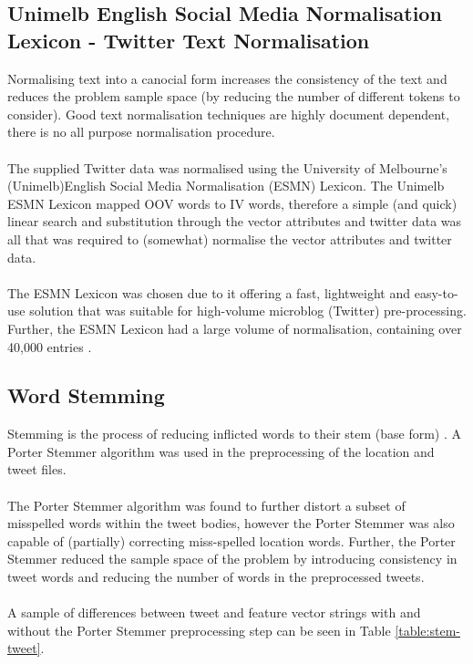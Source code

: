 \documentclass[11pt]{article}
\begin{document}
\subsection{Unimelb English Social Media Normalisation Lexicon - Twitter Text Normalisation}
Normalising text into a canocial form increases the consistency of the text and reduces the problem sample space (by reducing the number of different tokens to consider). Good text normalisation techniques are highly document dependent, there is no all purpose normalisation procedure.\\\\
The supplied Twitter data was normalised using the University of Melbourne's (Unimelb)English Social Media Normalisation (ESMN) Lexicon. The Unimelb ESMN Lexicon mapped OOV words to IV words, therefore a simple (and quick) linear search and substitution through the vector attributes and twitter data was all that was required to (somewhat) normalise the vector attributes and twitter data.\\\\
The ESMN Lexicon was chosen due to it offering a fast, lightweight and easy-to-use solution that was suitable for high-volume microblog (Twitter) pre-processing. Further, the ESMN Lexicon had a large volume of normalisation, containing over 40,000 entries \citep{bald-ESMNL}. 

\subsection{Word Stemming}

Stemming is the process of reducing inflicted words to their stem (base form) \citep{pm-stem}. A Porter Stemmer algorithm was used in the preprocessing of the location and tweet files. \\\\
The Porter Stemmer algorithm was found to further distort a subset of misspelled words within the tweet bodies, however the Porter Stemmer was also capable of (partially) correcting miss-spelled location words. Further, the Porter Stemmer reduced the sample space of the problem by introducing consistency in tweet words and reducing the number of words in the preprocessed tweets.\\\\
A sample of differences between tweet and feature vector strings with and without the Porter Stemmer preprocessing step can be seen in Table \ref{table:stem-tweet}.
   
\end{document}
